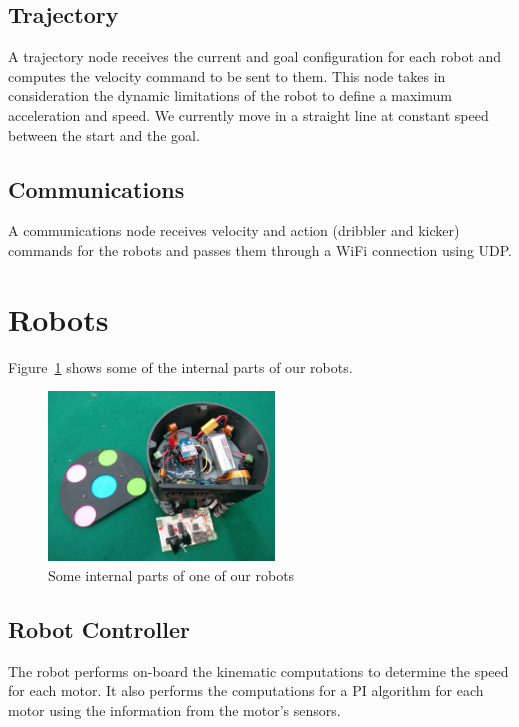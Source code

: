 \documentclass[]{llncs}
\newcommand{\TODO}[1]{{\textcolor{blue}{ToDo: {#1}}}}
\begin{document}
 
\subsection{Trajectory}
A trajectory node receives the current and goal configuration for each robot and computes the velocity command to be sent to them. This node takes in consideration the dynamic limitations of the robot to define a maximum acceleration and speed. We currently move in a straight line at constant speed between the start and the goal.


\subsection{Communications}
A communications node receives velocity and action (dribbler and kicker) commands for the robots and passes them through a WiFi connection using UDP.




\section{Robots}

Figure~\ref{fig:one_ekbot_inside} shows some of the internal parts of our robots.

\begin{figure}[htb]
	\centering
	\includegraphics[width=6cm]{./pictures/one_ekbot_inside.jpg}
	\caption{Some internal parts of one of our robots}
	\label{fig:one_ekbot_inside}  
\end{figure}


\subsection{Robot Controller}
The robot performs on-board the kinematic computations to determine the speed for each motor. It also performs the computations for a PI algorithm for each motor using the information from the motor's sensors.  
\end{document}
